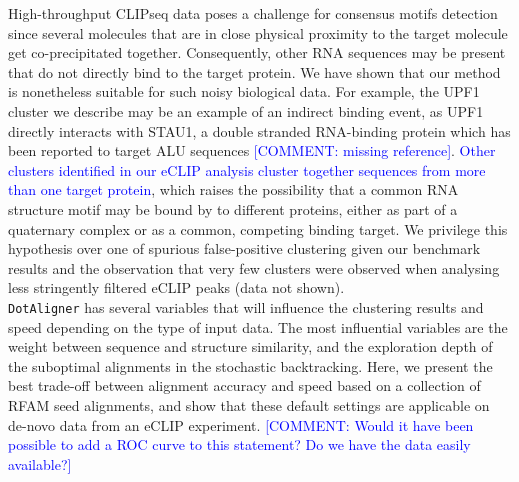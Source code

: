 \documentclass{bmcart}
\newcommand\dotaligner{\texttt{DotAligner}}
\begin{document}
High-throughput CLIPseq data poses a challenge for consensus motifs detection since
several molecules that are in close physical proximity to the target molecule get 
co-precipitated together. Consequently, other RNA sequences may be present 
that do not directly bind to the target protein. We have shown that our 
 method is nonetheless suitable for such noisy biological data. For example, 
 the UPF1 cluster we describe may be an example of an indirect binding event, 
 as UPF1 directly interacts with STAU1, a double stranded RNA-binding protein which has 
been reported to target ALU sequences \cite{gong2011lncrnas} \textcolor{blue}{[COMMENT: missing reference]}. \textcolor{blue} {Other clusters identified in our eCLIP analysis cluster together sequences from 
more than one target protein}, which raises the possibility 
that a common RNA structure motif may be bound by to different proteins, either
as part of a quaternary complex or as a common, competing binding target. 
We privilege this hypothesis over one of spurious false-positive clustering 
given our benchmark results and the observation that very few clusters
were observed when analysing less stringently filtered eCLIP peaks (data not shown). \\

\dotaligner{} has several variables that will influence the clustering results and 
speed depending on the type of input data. The most influential variables are 
the weight between sequence and structure similarity, 
and the exploration depth of the suboptimal alignments in the stochastic
backtracking. Here, we present the best trade-off between alignment
accuracy and speed based on a collection of RFAM seed alignments, 
and show that these default settings are applicable on de-novo data from an eCLIP 
experiment. \textcolor{blue} {[COMMENT: Would it have been possible to add a ROC curve to this statement? Do we have the data easily available?]} \\
\end{document}

